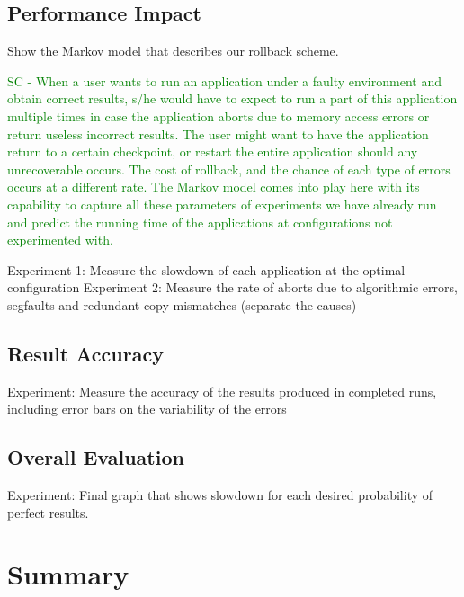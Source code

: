 \documentclass{sig-alternate}
\newcommand{\sui}[1]{%
  \textcolor{green}{SC - #1}
}
\begin{document}
\subsection{Performance Impact}
\label{sec:eval:perf}

Show the Markov model that describes our rollback scheme.

\sui{When a user wants to run an application under a faulty environment and obtain correct results, s/he would have to expect to run a part of this application multiple times in case the application aborts due to memory access errors or return useless incorrect results. The user might want to have the application return to a certain checkpoint, or restart the entire application should any unrecoverable occurs. The cost of rollback, and the chance of each type of errors occurs at a different rate. The Markov model comes into play here with its capability to capture all these parameters of experiments we have already run and predict the running time of the applications at configurations not experimented with.}


Experiment 1: Measure the slowdown of each application at the optimal configuration
Experiment 2: Measure the rate of aborts due to algorithmic errors, segfaults and redundant copy mismatches (separate the causes)

\subsection{Result Accuracy}
\label{sec:eval:acc}

Experiment: Measure the accuracy of the results produced in completed runs, including error bars on the variability of the errors

\subsection{Overall Evaluation}
\label{sec:eval:overall}

Experiment: Final graph that shows slowdown for each desired probability of perfect results.

\section{Summary}
\label{sec:summary}



\end{document}
